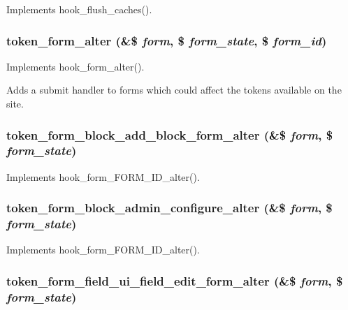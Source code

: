 \label{token_8module_ae34f0dc7cf6af04b24b316b824b2fe27}
Implements hook\_\-flush\_\-caches(). \hypertarget{token_8module_a6cb9dc162c6317ddc6edbc64acbc12e0}{
\subsubsection[{token\_\-form\_\-alter}]{\setlength{\rightskip}{0pt plus 5cm}token\_\-form\_\-alter (\&\$ {\em form}, \/  \$ {\em form\_\-state}, \/  \$ {\em form\_\-id})}}
\label{token_8module_a6cb9dc162c6317ddc6edbc64acbc12e0}
Implements hook\_\-form\_\-alter().

Adds a submit handler to forms which could affect the tokens available on the site. \hypertarget{token_8module_a7a29ce869431da05b8fc1f92bde7f655}{
\subsubsection[{token\_\-form\_\-block\_\-add\_\-block\_\-form\_\-alter}]{\setlength{\rightskip}{0pt plus 5cm}token\_\-form\_\-block\_\-add\_\-block\_\-form\_\-alter (\&\$ {\em form}, \/  \$ {\em form\_\-state})}}
\label{token_8module_a7a29ce869431da05b8fc1f92bde7f655}
Implements hook\_\-form\_\-FORM\_\-ID\_\-alter(). \hypertarget{token_8module_aae92360a59b14abf3de3aad884459bbc}{
\subsubsection[{token\_\-form\_\-block\_\-admin\_\-configure\_\-alter}]{\setlength{\rightskip}{0pt plus 5cm}token\_\-form\_\-block\_\-admin\_\-configure\_\-alter (\&\$ {\em form}, \/  \$ {\em form\_\-state})}}
\label{token_8module_aae92360a59b14abf3de3aad884459bbc}
Implements hook\_\-form\_\-FORM\_\-ID\_\-alter(). \hypertarget{token_8module_aafd876aa871c14cf1c4ed7cc130a7fef}{
\subsubsection[{token\_\-form\_\-field\_\-ui\_\-field\_\-edit\_\-form\_\-alter}]{\setlength{\rightskip}{0pt plus 5cm}token\_\-form\_\-field\_\-ui\_\-field\_\-edit\_\-form\_\-alter (\&\$ {\em form}, \/  \$ {\em form\_\-state})}}
